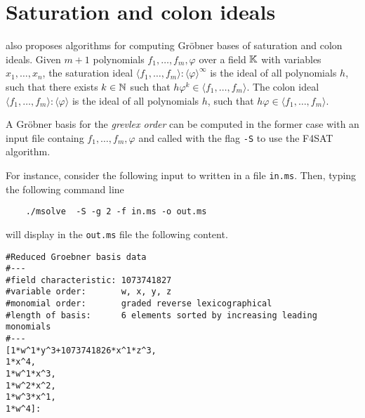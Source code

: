 \documentclass[a4paper,english,11pt]{scrartcl}
\theoremstyle{definition}
\theoremstyle{remark}
\begin{document}
\section{Saturation and colon ideals}\label{sec:f4sat}
\msolve also proposes algorithms for computing Gr\"obner bases of
saturation and colon ideals. Given $m+1$ polynomials
$f_1,\ldots,f_m,\varphi$ over a field $\mathbb{K}$ with variables
$x_1,\ldots,x_n$,
the saturation ideal
$\langle f_1,\ldots,f_m\rangle:\langle \varphi\rangle^{\infty}$ is the ideal of all
polynomials $h$, such that there exists $k\in\mathbb{N}$ such that
$h \varphi^k\in\langle f_1,\ldots,f_m\rangle$.
The colon ideal
$\langle f_1,\ldots,f_m\rangle:\langle \varphi\rangle$ is the ideal of all
polynomials $h$, such that
$h \varphi\in\langle f_1,\ldots,f_m\rangle$.

A Gr\"obner basis for the \emph{grevlex order} can be computed in the
former case with an input file containg $f_1,\ldots,f_m,\varphi$ and
called with the flag \verb+-S+ to use the F4SAT algorithm.

For instance, consider the following input to \msolve written in a file
\verb+in.ms+.
Then, typing the following command line
\begin{tcolorbox} %
  \begin{verbatim}
    ./msolve  -S -g 2 -f in.ms -o out.ms 
  \end{verbatim}
\end{tcolorbox}
will display in the \verb+out.ms+ file the following content. 
\begin{tcolorbox}
  \begin{lstlisting}
#Reduced Groebner basis data
#---
#field characteristic: 1073741827
#variable order:       w, x, y, z
#monomial order:       graded reverse lexicographical
#length of basis:      6 elements sorted by increasing leading monomials
#---
[1*w^1*y^3+1073741826*x^1*z^3,
1*x^4,
1*w^1*x^3,
1*w^2*x^2,
1*w^3*x^1,
1*w^4]:
  \end{lstlisting}
\end{tcolorbox}



\end{document}
